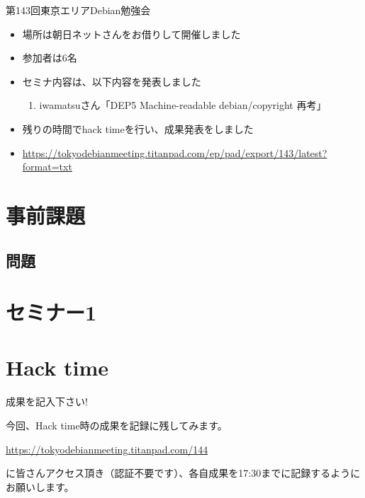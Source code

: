 \begin{frame}{第143回東京エリアDebian勉強会}

\begin{itemize}
\item 場所は朝日ネットさんをお借りして開催しました
\item 参加者は6名
\item セミナ内容は、以下内容を発表しました
  \begin{enumerate}
  \item iwamatsuさん「DEP5 Machine-readable debian/copyright 再考」
  \end{enumerate}
\item 残りの時間でhack timeを行い、成果発表をしました
\item \url{https://tokyodebianmeeting.titanpad.com/ep/pad/export/143/latest?format=txt}
\end{itemize} 
\end{frame}

\section{事前課題}
{\footnotesize
 
}

\subsection{問題}



\section{セミナー1}

\section{Hack time}

\begin{frame}{成果を記入下さい!}

  今回、Hack time時の成果を記録に残してみます。

\url{https://tokyodebianmeeting.titanpad.com/144}

に皆さんアクセス頂き（認証不要です）、各自成果を17:30までに記録するようにお願いします。

\end{frame}
  
